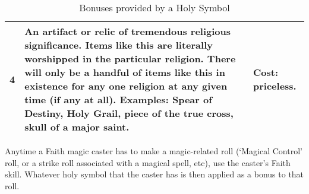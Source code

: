 \documentclass[twoside]{book}
\begin{document}
\begin{table}[htb]
\begin{center}
\begin{tabular}{|p{2em}|p{4.5in}|p{1.5in}|}
\hline

 4 & An artifact or relic of tremendous religious
                     significance. Items like this are literally
                     worshipped in the particular religion. There will
                     only be a handful of items like this in existence
                     for any one religion at any given time (if any at
                     all). Examples: Spear of Destiny, Holy Grail, piece
                     of the true cross, skull of a major saint. & Cost: priceless. \\

\hline


  \end{tabular}
  
\caption{Bonuses provided by a Holy Symbol}
  
  \end{center}
\end{table}
    Anytime a Faith magic caster has to make a
               magic-related roll (`Magical Control' roll, or
               a strike roll associated with a magical spell, etc), use
               the caster's Faith skill. Whatever holy symbol that
               the caster has is then applied as a bonus to that roll.
               
    
\end{document}
